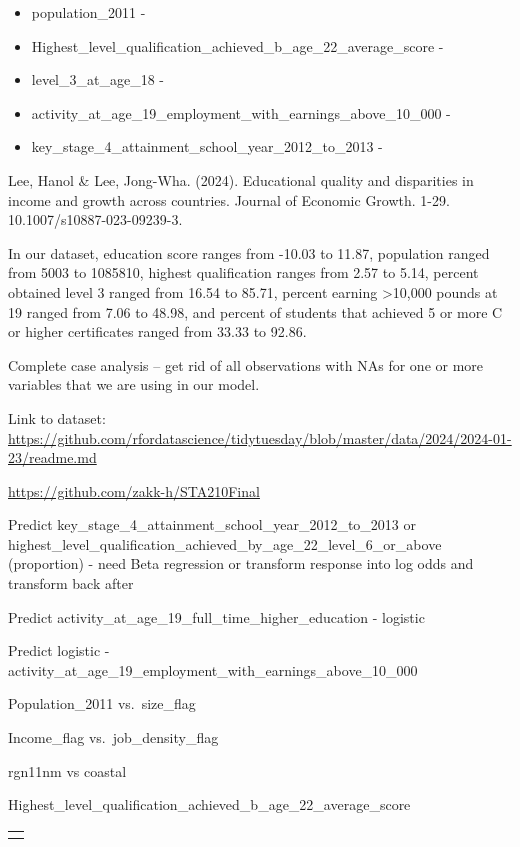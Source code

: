 \documentclass[
  letterpaper,
  DIV=11,
  numbers=noendperiod]{scrartcl}
\begin{document}
\begin{itemize}
\item
  population\_2011 -~
\item
  Highest\_level\_qualification\_achieved\_b\_age\_22\_average\_score -
\item
  level\_3\_at\_age\_18 -~
\item
  activity\_at\_age\_19\_employment\_with\_earnings\_above\_10\_000 -
\item
  key\_stage\_4\_attainment\_school\_year\_2012\_to\_2013 -
\end{itemize}

Lee, Hanol \& Lee, Jong-Wha. (2024). Educational quality and disparities
in income and growth across countries. Journal of Economic Growth. 1-29.
10.1007/s10887-023-09239-3.~

In our dataset, education score ranges from -10.03 to 11.87, population
ranged from 5003 to 1085810, highest qualification ranges from 2.57 to
5.14, percent obtained level 3 ranged from 16.54 to 85.71, percent
earning \textgreater10,000 pounds at 19 ranged from 7.06 to 48.98, and
percent of students that achieved 5 or more C or higher certificates
ranged from 33.33 to 92.86.

Complete case analysis -- get rid of all observations with NAs for one
or more variables that we are using in our model.~

Link to dataset:
\url{https://github.com/rfordatascience/tidytuesday/blob/master/data/2024/2024-01-23/readme.md}

\url{https://github.com/zakk-h/STA210Final}

Predict key\_stage\_4\_attainment\_school\_year\_2012\_to\_2013 or
highest\_level\_qualification\_achieved\_by\_age\_22\_level\_6\_or\_above
(proportion) - need Beta regression or transform response into log odds
and transform back after

Predict activity\_at\_age\_19\_full\_time\_higher\_education - logistic

Predict logistic -
activity\_at\_age\_19\_employment\_with\_earnings\_above\_10\_000

Population\_2011 vs.~size\_flag~

Income\_flag vs.~job\_density\_flag

rgn11nm vs coastal

Highest\_level\_qualification\_achieved\_b\_age\_22\_average\_score

\begin{longtable}[]{@{}l@{}}
\toprule\noalign{}
\endhead
\bottomrule\noalign{}
\endlastfoot
 \\
\end{longtable}
\end{document}
